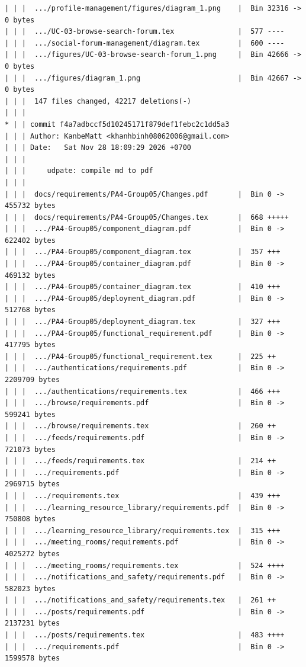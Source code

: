 \documentclass[12pt]{article}
\begin{document}
\begin{lstlisting}[numbers=none,breaklines=true]
| | |  .../profile-management/figures/diagram_1.png    |  Bin 32316 -> 0 bytes
| | |  .../UC-03-browse-search-forum.tex               |  577 ----
| | |  .../social-forum-management/diagram.tex         |  600 ----
| | |  .../figures/UC-03-browse-search-forum_1.png     |  Bin 42666 -> 0 bytes
| | |  .../figures/diagram_1.png                       |  Bin 42667 -> 0 bytes
| | |  147 files changed, 42217 deletions(-)
| | |
* | | commit f4a7adbccf5d10245171f879def1febc2c1dd5a3
| | | Author: KanbeMatt <khanhbinh08062006@gmail.com>
| | | Date:   Sat Nov 28 18:09:29 2026 +0700
| | |
| | |     udpate: compile md to pdf
| | |
| | |  docs/requirements/PA4-Group05/Changes.pdf       |  Bin 0 -> 455732 bytes
| | |  docs/requirements/PA4-Group05/Changes.tex       |  668 +++++
| | |  .../PA4-Group05/component_diagram.pdf           |  Bin 0 -> 622402 bytes
| | |  .../PA4-Group05/component_diagram.tex           |  357 +++
| | |  .../PA4-Group05/container_diagram.pdf           |  Bin 0 -> 469132 bytes
| | |  .../PA4-Group05/container_diagram.tex           |  410 +++
| | |  .../PA4-Group05/deployment_diagram.pdf          |  Bin 0 -> 512768 bytes
| | |  .../PA4-Group05/deployment_diagram.tex          |  327 +++
| | |  .../PA4-Group05/functional_requirement.pdf      |  Bin 0 -> 417795 bytes
| | |  .../PA4-Group05/functional_requirement.tex      |  225 ++
| | |  .../authentications/requirements.pdf            |  Bin 0 -> 2209709 bytes
| | |  .../authentications/requirements.tex            |  466 +++
| | |  .../browse/requirements.pdf                     |  Bin 0 -> 599241 bytes
| | |  .../browse/requirements.tex                     |  260 ++
| | |  .../feeds/requirements.pdf                      |  Bin 0 -> 721073 bytes
| | |  .../feeds/requirements.tex                      |  214 ++
| | |  .../requirements.pdf                            |  Bin 0 -> 2969715 bytes
| | |  .../requirements.tex                            |  439 +++
| | |  .../learning_resource_library/requirements.pdf  |  Bin 0 -> 750808 bytes
| | |  .../learning_resource_library/requirements.tex  |  315 +++
| | |  .../meeting_rooms/requirements.pdf              |  Bin 0 -> 4025272 bytes
| | |  .../meeting_rooms/requirements.tex              |  524 ++++
| | |  .../notifications_and_safety/requirements.pdf   |  Bin 0 -> 582023 bytes
| | |  .../notifications_and_safety/requirements.tex   |  261 ++
| | |  .../posts/requirements.pdf                      |  Bin 0 -> 2137231 bytes
| | |  .../posts/requirements.tex                      |  483 ++++
| | |  .../requirements.pdf                            |  Bin 0 -> 1599578 bytes

\end{lstlisting}
\end{document}
